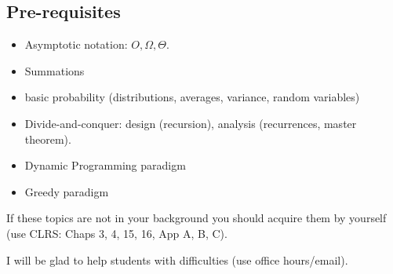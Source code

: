 \subsection{Pre-requisites}
\begin{itemize}
\item Asymptotic notation: $O,\Omega,\Theta$.
\item Summations
\item basic probability (distributions, averages, variance, random variables)
\item Divide-and-conquer: design (recursion), analysis (recurrences, master theorem).
\item Dynamic Programming paradigm 
\item Greedy paradigm 
\end{itemize}
If these topics are not in your background you should acquire them by yourself (use CLRS: Chaps 3, 4, 15, 16, App A, B, C).

I will be glad to help students with difficulties (use office hours/email).

